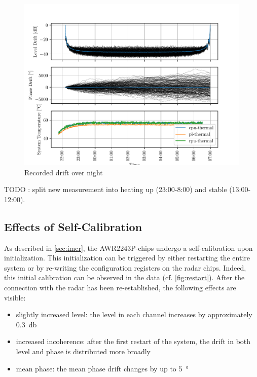 \begin{figure}
    \centering
    \includegraphics[width=\textwidth]{../figures/meas_24-02-16_phase_drift.pdf}
    \caption{Recorded drift over night}
    \label{fig:weekend}
\end{figure}
TODO : split new measurement into heating up (23:00-8:00) and stable (13:00-12:00).


\subsection{Effects of Self-Calibration}
As described in \autoref{sec:imcr}, the AWR2243P-chips undergo a self-calibration upon initialization.
This initialization can be triggered by either restarting the entire system 
or by re-writing the configuration registers on the radar chips.
Indeed, this initial calibration can be observed in the data (cf. \ref{fig:restart}).
After the connection with the radar has been re-established, the following effects are visible:
\begin{itemize}
    \item slightly increased level: the level in each channel increases by approximately \SI{0.3}{\decibel}
    \item increased incoherence: after the first restart of the system, the drift in both level and phase is distributed more broadly
    \item mean phase: the mean phase drift changes by up to \SI{5}{\degree}
\end{itemize}

